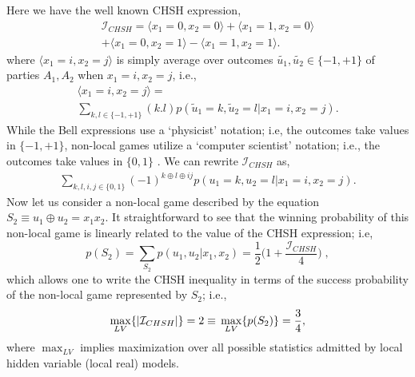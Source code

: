 \documentclass[%
 reprint,
 amsmath,amssymb,
 aps,
]{revtex4-1}
\theoremstyle{plain}
\begin{document}
Here we have the well known CHSH expression,
\begin{multline}
\mathcal{I}_{CHSH} = \langle x_1=0,x_2=0 \rangle + \langle x_1=1,x_2=0 \rangle \\
 + \langle x_1=0,x_2=1 \rangle - \langle x_1=1,x_2=1 \rangle.
\end{multline}
where $\langle x_1=i,x_2=j \rangle$ is simply average over outcomes $\tilde{u_1},\tilde{u_2} \in \{-1,+1\}$ of parties $A_1, A_2$ when $x_1=i,x_2=j$, i.e., 
\begin{multline}
\langle x_1=i,x_2=j \rangle= \\\sum_{k,l \in \{-1,+1\}}(k.l) p(\tilde{u}_1=k,\tilde{u}_2=l|x_1=i,x_2=j).
\end{multline}
While the Bell expressions use a `physicist' notation; i.e, the outcomes take values in $\{-1,+1\}$, non-local games utilize a `computer scientist' notation; i.e., the outcomes take values in $\{0,1\}$ \cite{pironio2011extremal}. We can rewrite $\mathcal{I}_{CHSH}$ as,
\begin{multline}\label{refmenow}
\sum_{k,l,i,j \in \{0,1\}}(-1)^{k\oplus l \oplus  ij }p(u_1=k,u_2=l|x_1=i,x_2=j).
\end{multline}
Now let us consider a non-local game described by the equation $S_2\equiv u_1 \oplus u_2 =x_1x_2$. It straightforward to see that the winning probability of this non-local game is linearly related to the value of the CHSH expression; i.e, 
\begin{equation}
p(S_2)=\sum_{S_2}p(u_1,u_2|x_1,x_2)=\frac{1}{2}\big(1+\frac{\mathcal{I}_{CHSH}}{4}\big) \;,
\end{equation}
which allows one to write the CHSH inequality in terms of the success probability of the non-local game represented by $S_2$; i.e.,
\begin{equation}\label{CHSH}
\max_{LV}\{|\mathcal{I}_{CHSH}|\} = 2 \equiv \\ \max_{LV}\{p(S_2)\}= \frac{3}{4},
\end{equation}
where $\max_{LV}$ implies maximization over all possible statistics admitted by local hidden variable (local real) models. 
\end{document}
